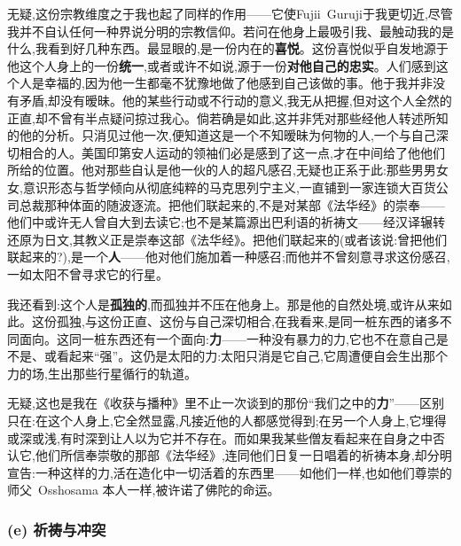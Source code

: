 无疑,这份宗教维度之于我也起了同样的作用——它使Fujii~Guruji于我更切近,尽管我并不自认任何一种界说分明的宗教信仰。若问在他身上最吸引我、最触动我的是什么,我看到好几种东西。最显眼的,是一份内在的\textbf{喜悦}。这份喜悦似乎自发地源于他这个人身上的一份\textbf{统一},或者或许不如说,源于一份\textbf{对他自己的忠实}。人们感到这个人是幸福的,因为他一生都毫不犹豫地做了他感到自己该做的事。他于我并非没有矛盾,却没有暧昧。他的某些行动或不行动的意义,我无从把握\dmark{},但对这个人全然的正直,却不曾有半点疑问掠过我心。倘若确是如此,这并非凭对那些经他人转述所知的他的分析。只消见过他一次,便知道这是一个不知暧昧为何物的人,一个与自己深切相合的人。美国印第安人运动的领袖们必是感到了这一点,才在中间给了他他们所给的位置。他对那些自认是他一伙的人的超凡感召,无疑也正系于此:那些男男女女,意识形态与哲学倾向从彻底纯粹的马克思列宁主义,一直铺到一家连锁大百货公司总裁那种体面的随波逐流。把他们联起来的,不是对某部《法华经》的崇奉——他们中或许无人曾自大到去读它;也不是某篇源出巴利语的祈祷文——经汉译辗转还原为日文,其教义正是崇奉这部《法华经》。把他们联起来的(或者该说:曾把他们联起来的?),是一个\textbf{人}——他对他们施加着一种感召;而他并不曾刻意寻求这份感召,一如太阳不曾寻求它的行星。

我还看到:这个人是\textbf{孤独的},而孤独并不压在他身上。那是他的自然处境,或许从来如此。这份孤独,与这份正直、这份与自己深切相合,在我看来,是同一桩东西的诸多不同面向。这同一桩东西还有一个面向:\textbf{力}——一种没有暴力的力,它也不在意自己是不是、或看起来“强”。这仍是太阳的力:太阳只消是它自己,它周遭便自会生出那个力的场,生出那些行星循行的轨道。

无疑,这也是我在《收获与播种》里不止一次谈到的那份“我们之中的\textbf{力}”——区别只在:在这个人身上,它全然显露,凡接近他的人都感觉得到;在另一个人身上,它埋得或深或浅,有时深到让人以为它并不存在。而如果我某些僧友看起来在自身之中否认它,他们所信奉崇敬的那部《法华经》,连同他们日复一日唱着的祈祷本身\dmark{},却分明宣告:一种这样的力,活在造化中一切活着的东西里——如他们一样,也如他们尊崇的师父~Osshosama 本人一样,被许诺了佛陀的命运。

\subsubsection*{(e) 祈祷与冲突}
\label{ch18:local:h75}

